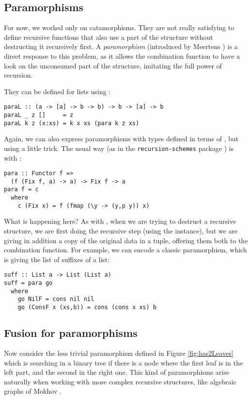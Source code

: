 \subsection{Paramorphisms}
\label{sec:para-list}

For now, we worked only on catamorphisms. They are not really satisfying to define recursive functions that also use a part of the structure without destructing it recursively first. A \emph{paramorphism} (introduced by Meertens \cite{Meertens1992}) is a direct response to this problem, as it allows the combination function to have a look on the unconsumed part of the structure, imitating the full power of recursion.

They can be defined for lists using :
\begin{verbatim}
paraL :: (a -> [a] -> b -> b) -> b -> [a] -> b
paraL _ z []     = z
paraL k z (x:xs) = k x xs (para k z xs)
\end{verbatim}

\noindent Again, we can also express paramorphisms with types defined in terms of , but using a little trick. The usual way (as in the \verb|recursion-schemes| package \cite{ekmett:eschems}) is with :
\begin{verbatim}
para :: Functor f =>
  (f (Fix f, a) -> a) -> Fix f -> a
para f = c
  where
    c (Fix x) = f (fmap (\y -> (y,p y)) x)
\end{verbatim}

\noindent What is happening here? As with , when we are trying to destruct a recursive structure, we are first doing the recursive step (using the  instance), but we are giving in addition a copy of the original data in a tuple, offering them both to the combination function.
For example, we can encode a classic paramorphism, which is giving the list of suffixes of a list:
\begin{verbatim}
suff :: List a -> List (List a)
suff = para go
  where
    go NilF = cons nil nil
    go (ConsF x (xs,b)) = cons (cons x xs) b
\end{verbatim}

\subsection{Fusion for paramorphisms}

Now consider the less trivial paramorphism  defined in Figure \ref{fig:has2Leaves} which is searching in a binary tree if there is a node where the first leaf is in the left part, and the second in the right one. This kind of paramorphisms arise naturally when working with more complex recursive structures, like algebraic graphs of Mokhov \cite{Mokhov:2017:AGC:3156695.3122956}.

